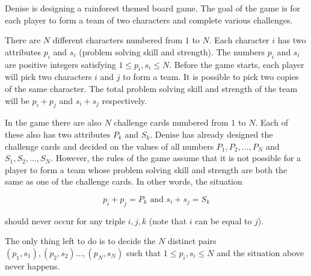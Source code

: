 


Denise is designing a rainforest themed board game. The goal of the game is for each player to form a 
team of two characters and complete various challenges.

There are $N$ different characters numbered from $1$ to $N$.
Each character $i$ has two attributes $p_i$ and $s_i$ (problem solving skill and strength).
The numbers $p_i$ and $s_i$ are positive integers satisfying $1 \leq p_i, s_i \leq N$.
Before the game starts, each player will pick two characters $i$ and $j$ to form a team. 
It is possible to pick two copies of the same character.
The total problem solving skill and strength of the team will be $p_i + p_j$ and $s_i + s_j$
respectively. 

In the game there are also $N$ challenge cards numbered from $1$ to $N$. Each of these also
has two attributes $P_k$ and $S_k$. Denise has already designed the challenge cards and 
decided on the values of all numbers $P_1, P_2, \dots, P_N$ and $S_1, S_2, \dots, S_N$. 
However, the rules of the game assume that it is not possible for a player to form a team
whose problem solving skill and strength are both the same as one of the challenge cards. In other 
words, the situation 

$$p_i+p_j = P_k \text{ and } s_i+s_j = S_k$$

should never occur for any triple $i,j,k$ (note that $i$ can be equal to $j$).

The only thing left to do is to decide the $N$ distinct pairs $(p_1, s_1), (p_2, s_2) \dots, (p_N, s_N)$ such
that $1 \leq p_i, s_i \leq N$ and the situation above never happens.

